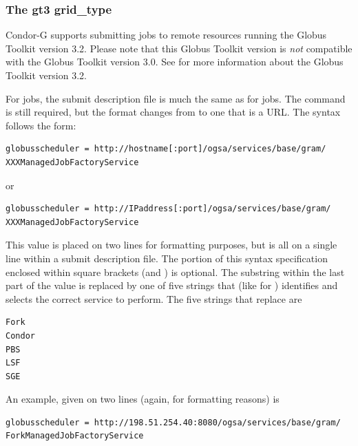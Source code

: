 \subsubsection{\label{sec:Using-gt3}The gt3 grid\_type}

Condor-G supports submitting jobs to remote resources running
the Globus Toolkit version 3.2.
Please note that this Globus Toolkit version
is \emph{not} compatible with the Globus Toolkit version 3.0.
See
for more information about the Globus Toolkit version 3.2.

For   jobs,
the submit description file is much the same as for
  jobs.
The  command is still required,
but the format changes from 
to one that is a URL. 
The syntax follows the form:
\footnotesize
\begin{verbatim}
globusscheduler = http://hostname[:port]/ogsa/services/base/gram/
XXXManagedJobFactoryService
\end{verbatim}
\normalsize

or
\footnotesize
\begin{verbatim}
globusscheduler = http://IPaddress[:port]/ogsa/services/base/gram/
XXXManagedJobFactoryService
\end{verbatim}
\normalsize

This value is placed on two lines for
formatting purposes, but is all on a single line within
a submit description file.
The portion of this syntax specification enclosed within
square brackets (\Lbr and \Rbr) is optional.
The substring \verb@XXX@ within the last part of the value
is replaced by one of five strings that (like for 
) identifies and selects the correct service to perform.
The five strings that replace \verb@XXX@ are
\begin{verbatim}
Fork
Condor
PBS
LSF
SGE
\end{verbatim}


An example, given on two lines (again, for formatting reasons) is 
\footnotesize
\begin{verbatim}
globusscheduler = http://198.51.254.40:8080/ogsa/services/base/gram/
ForkManagedJobFactoryService
\end{verbatim}
\normalsize

